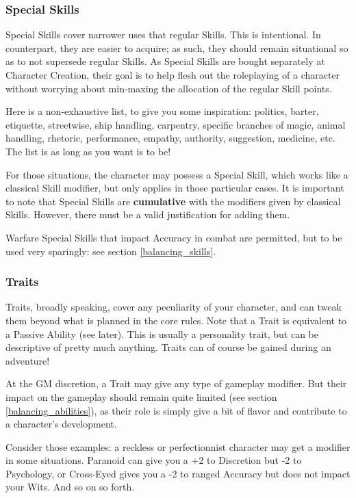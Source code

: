 \subsubsection{Special Skills}

Special Skills cover narrower uses that regular Skills. This is intentional. In counterpart, they are easier to acquire; as such, they should remain situational so as to not supersede regular Skills. As Special Skills are bought separately at Character Creation, their goal is to help flesh out the roleplaying of a character without worrying about min-maxing the allocation of the regular Skill points.

Here is a non-exhaustive list, to give you some inspiration: politics, barter, etiquette, streetwise, ship handling, carpentry, specific branches of magic, animal handling, rhetoric, performance, empathy, authority, suggestion, medicine, etc. The list is as long as you want is to be!

For those situations, the character may possess a Special Skill, which works like a classical Skill modifier, but only applies in those particular cases. It is important to note that Special Skills are \textbf{cumulative} with the modifiers given by classical Skills. However, there must be a valid justification for adding them.

Warfare Special Skills that impact Accuracy in combat are permitted, but to be used very sparingly: see section \ref{balancing_skills}.


\subsubsection{Traits}

Traits, broadly speaking, cover any peculiarity of your character, and can tweak them beyond what is planned in the core rules. Note that a Trait is equivalent to a Passive Ability (see later). This is usually a personality trait, but can be descriptive of pretty much anything. Traits can of course be gained during an adventure!

At the GM discretion, a Trait may give any type of gameplay modifier. But their impact on the gameplay should remain quite limited (see section \ref{balancing_abilities}), as their role is simply give a bit of flavor and contribute to a character's development. 

Consider those examples: a reckless or perfectionnist character may get a modifier in some situations. Paranoid can give you a +2 to Discretion but -2 to Psychology, or Cross-Eyed gives you a -2 to ranged Accuracy but does not impact your Wits. And so on so forth.

